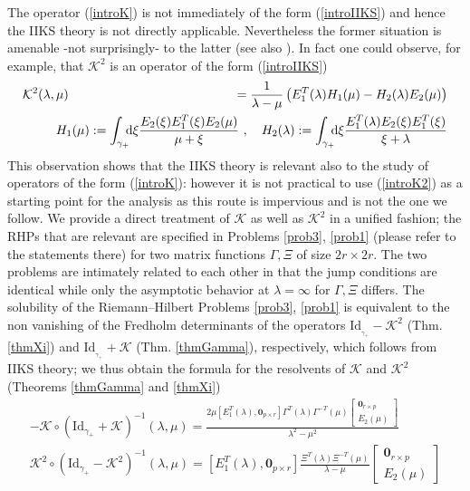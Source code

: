 \documentclass{article}
\def \K{{\mathcal K}}
\def\&{&\hspace{-20pt}}
\def\d{{\rm d}}
\def\Id{\mathrm{Id}}
\def\0{{\mathbf 0}}
\newcommand{\be}{\begin{eqnarray}}
\newcommand{\ee}{\end{eqnarray}}
\def\le{\left}
\def\ri{\right}
\begin{document}
The operator (\ref{introK}) is not immediately of the form (\ref{introIIKS}) and hence the IIKS theory is not directly applicable. Nevertheless the former situation is amenable -not surprisingly- to the latter (see also \cite{TWmKdV}). In fact one could observe, for example, that $\K^2$ is an operator of the form (\ref{introIIKS}) 
\be
\mathcal K^2(\lambda,\mu) &\& = \frac 1{\lambda-\mu} \le( E_1^T(\lambda) H_1(\mu) - H_2(\lambda)E_2(\mu)\ri)\nonumber \\
&\& H_1(\mu):= \int_{\gamma_+} \!\!\!\d\xi\frac {E_2(\xi)E_1^T(\xi)E_2(\mu)}{\mu+\xi} \ ,\ \ \ H_2(\lambda):=\int_{\gamma_+}\!\!\!\d\xi \frac {E_1^T(\lambda)E_2(\xi)E_1^T(\xi)}{\xi+\lambda}
\label{introK2}
\ee
This observation shows that the IIKS theory is relevant also to the study of operators of the form (\ref{introK}): however it is not practical to use (\ref{introK2}) as a starting point for the analysis as this route is impervious and is not the one we follow.
We provide a direct treatment of $\K$ as well as $\K^2$ in a unified fashion; the RHPs that  are relevant  are specified in Problems \ref{prob3}, \ref{prob1} (please refer to the statements there) for two matrix functions $\Gamma,\Xi$ of size $2r\times 2r$. The two problems are intimately related to each other in that the jump conditions are identical while only the asymptotic behavior at $\lambda=\infty$ for $\Gamma, \Xi$ differs.
 The solubility of the Riemann--Hilbert Problems \ref{prob3}, \ref{prob1} is equivalent to the non vanishing of the Fredholm determinants of the operators  $\Id_{_{\gamma_+}} - \K^2 $ (Thm. \ref{thmXi}) and $\Id_{_{\gamma_+}}+\K$ (Thm. \ref{thmGamma}), respectively,  which follows from IIKS theory; we thus obtain the formula for the resolvents of $\K$ and $\K^2$ (Theorems \ref{thmGamma} and \ref{thmXi}) 
\be
-\K\circ(\Id_{\gamma_+} + \K)^{-1}(\lambda,\mu)  =
\frac {2 \mu \le[E_1^T(\lambda),\0_{p\times r} \ri] \Gamma^{T}(\lambda) \Gamma^{-T}(\mu) 
\le[\begin{array}{c}
\0_{r\times p} 
\\
E_2(\mu)
\end{array} \ri]}{\lambda^2  - \mu^2}\\
%
 \K^2\circ(\Id_{\gamma_+} - \K^2)^{-1} (\lambda,\mu) = 
 [
E_1^T(\lambda)
,
\0_{p\times r}
] 
\frac{\Xi^{T}(\lambda)\Xi^{-T}(\mu)}{\lambda - \mu}\le[
\begin{array}{c}
\0_{r\times p}
\\
\!\!\! E_2(\mu)\!\!\! 
\end{array}
\ri]
\ee
\end{document}
